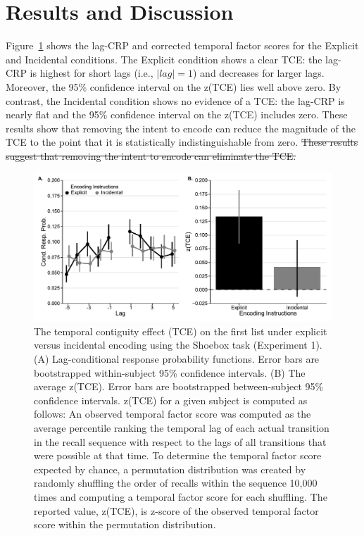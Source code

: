 \documentclass[man,natbib,floatsintext]{apa6} %
\begin{document}
\section{Results and Discussion}

Figure~\ref{e1_l1_crp} shows the lag-CRP and corrected temporal factor scores for the Explicit and Incidental conditions. The Explicit condition shows a clear TCE: the lag-CRP is highest for short lags (i.e., $|lag|=1$) and decreases for larger lags. Moreover, the 95\% confidence interval on the z(TCE) lies well above zero. By contrast, the Incidental condition shows no evidence of a TCE: the lag-CRP is nearly flat and the 95\% confidence interval on the z(TCE) includes zero. \color{red} These results show that removing the intent to encode can reduce the magnitude of the TCE to the point that it is statistically indistinguishable from zero.\color{black}  \st{These results suggest that removing the intent to encode can eliminate the TCE.}



\newcommand\paneltext{(A) Lag-conditional response probability functions. Error bars are bootstrapped within-subject 95\% confidence intervals. (B) The average z(TCE).  Error bars are bootstrapped between-subject 95\% confidence intervals. z(TCE) for a given subject is computed as follows: An observed temporal factor score was computed as the average percentile ranking the temporal lag of each actual transition in the recall sequence with respect to the lags of all transitions that were possible at that time. To determine the temporal factor score expected by chance, a permutation distribution was created by randomly shuffling the order of recalls within the sequence 10,000 times and computing a temporal factor score for each shuffling. The reported value, z(TCE), is z-score of the observed temporal factor score within the permutation distribution.}
\begin{figure}
\includegraphics{figures/E1_crp_list1.pdf}
\caption{The temporal contiguity effect (TCE) on the first list under explicit versus incidental encoding using the Shoebox task (Experiment 1). \paneltext}
\label{e1_l1_crp}
\end{figure}
\end{document}
